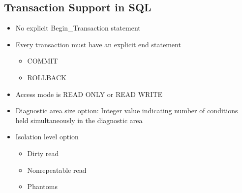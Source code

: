 \subsection{Transaction Support in SQL}
\begin{itemize}
    \item No explicit Begin\_Transaction statement
    \item Every transaction must have an explicit end statement
    \begin{itemize}
        \item COMMIT
        \item ROLLBACK
    \end{itemize}
    \item Access mode is READ ONLY or READ WRITE
    \item Diagnostic area size option: Integer value indicating number of conditions held 
simultaneously in the diagnostic area
    \item Isolation level option
    \begin{itemize}
        \item Dirty read
        \item Nonrepeatable read
        \item Phantoms
    \end{itemize}
\end{itemize}

